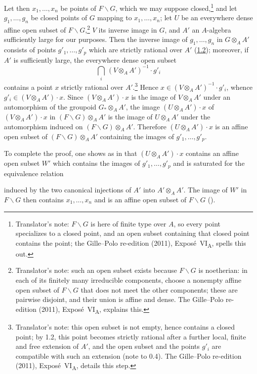 Let then \(x_1,\ldots,x_n\) be points of \(F\backslash G\), which we may
suppose closed,\footnote{Translator's note: \(F\backslash G\) is here of finite type over \(A\), so every
point specializes to a closed point, and an open subset containing that closed point contains the
point; the Gille--Polo re-edition (2011), Exposé~VI\textsubscript{A}, spells this out.} and let \(g_1,\ldots,g_n\) be closed points of \(G\) mapping to
\(x_1,\ldots,x_n\); let \(U\) be an everywhere dense affine open subset of
\(F\backslash G\),\footnote{Translator's note: such an open subset exists because \(F\backslash G\) is
noetherian: in each of its finitely many irreducible components, choose a nonempty affine open
subset of \(F\backslash G\) that does not meet the other components; these are pairwise disjoint, and
their union is affine and dense. The Gille--Polo re-edition (2011), Exposé~VI\textsubscript{A}, explains
this.} \(V\) its inverse image in \(G\), and \(A'\) an \(A\)-algebra
sufficiently large for our purposes. Then the inverse image of
\(g_1,\ldots,g_n\) in \(G\otimes_AA'\) consists of points
\(g'_1,\ldots,g'_p\) which are strictly rational over \(A'\)
(\hyperref[prop:sga3-VIA-1.2]{1.2}); moreover, if \(A'\) is sufficiently large, the everywhere
dense open subset
\[
  \bigcap_i\,(V\otimes_AA')^{-1}\cdot g'_i
\]
contains a point \(x\) strictly rational over \(A'\).\footnote{Translator's note: this open subset is
not empty, hence contains a closed point; by 1.2, this point becomes strictly rational after a further
local, finite and free extension of \(A'\), and the open subset and the points \(g'_i\) are
compatible with such an extension (note to 0.4). The Gille--Polo re-edition (2011),
Exposé~VI\textsubscript{A}, details this step.} Hence
\(x\in(V\otimes_AA')^{-1}\cdot g'_i\), whence
\(g'_i\in(V\otimes_AA')\cdot x\). Since \((V\otimes_AA')\cdot x\) is the image
of \(V\otimes_AA'\) under an automorphism of the groupoid \(G_*\otimes_AA'\), the
image \((U\otimes_AA')\cdot x\) of \((V\otimes_AA')\cdot x\) in
\((F\backslash G)\otimes_AA'\) is the image of \(U\otimes_AA'\) under the
automorphism induced on \((F\backslash G)\otimes_AA'\). Therefore
\((U\otimes_AA')\cdot x\) is an affine open subset of
\((F\backslash G)\otimes_AA'\) containing the images of \(g'_1,\ldots,g'_p\).

To complete the proof, one shows as in  that
\((U\otimes_AA')\cdot x\) contains an affine open subset \(W'\) which contains
the images of \(g'_1,\ldots,g'_p\) and is saturated for the equivalence relation
\begin{center}
  \label{diag:sga3-VIA-3.2.1-descent-equivalence}%
\end{center}
induced by the two canonical injections of \(A'\) into \(A'\otimes_AA'\). The
image of \(W'\) in \(F\backslash G\) then contains \(x_1,\ldots,x_n\) and is an
affine open subset of \(F\backslash G\) ().
